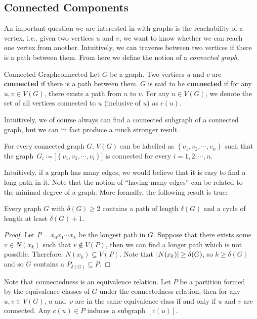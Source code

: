 \documentclass[math, code]{amznotes}
\theoremstyle{remark}
\begin{document}
\subsection{Connected Components}
An important question we are interested in with graphs is the reachability of a vertex, i.e., given two vertices $u$ and $v$, we want to know whether we can reach one vertex from another. Intuitively, we can traverse between two vertices if there is a path between them. From here we define the notion of a \textit{connected graph}.
\begin{dfnbox}{Connected Graph}{connected}
    Let $G$ be a graph. Two vertices $u$ and $v$ are {\color{red} \textbf{connected}} if there is a path between them. $G$ is said to be {\color{red} \textbf{connected}} if for any $u, v \in V(G)$, there exists a path from $u$ to $v$. For any $u \in V(G)$, we denote the set of all vertices connected to $u$ (inclusive of $u$) as $c(u)$.
\end{dfnbox}
Intuitively, we of course always can find a connected subgraph of a connected graph, but we can in fact produce a much stronger result.
\begin{probox}{}{}
    For every connected graph $G$, $V(G)$ can be labelled as $\left\{v_1, v_2, \cdots, v_n\right\}$ such that the graph~$G_i \coloneqq \bigl[\left\{v_1, v_2, \cdots, v_i\right\}\bigr]$ is connected for every $i = 1, 2, \cdots, n$.
\end{probox}
Intuitively, if a graph has many edges, we would believe that it is easy to find a long path in it. Note that the notion of ``having many edges'' can be related to the minimal degree of a graph. More formally, the following result is true:
\begin{probox}{}{}
    Every graph $G$ with $\delta(G) \geq 2$ contains a path of length $\delta(G)$ and a cycle of length at least $\delta(G) + 1$.
    \tcblower
    \begin{proof}
        Let $P = x_0x_1\cdots x_k$ be the longest path in $G$. Suppose that there exists some $v \in N(x_k)$ such that $v \notin V(P)$, then we can find a longer path which is not possible. Therefore, $N(x_k) \subseteq V(P)$. Note that ${\left\lvert {N(x_k)} \right\rvert} \geq \delta(G)$, so $k \geq \delta(G)$ and so $G$ contains a $P_{\delta(G)} \subseteq P$.
    \end{proof}
\end{probox}
Note that connectedness is an equivalence relation. Let $P$ be a partition formed by the equivalence classes of $G$ under the connectedness relation, then for any $u, v \in V(G)$, $u$ and~$v$ are in the same equivalence class if and only if $u$ and $v$ are connected. Any $c(u) \in P$ induces a subgraph $[c(u)]$.
\end{document}
